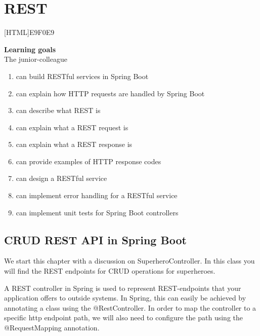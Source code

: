 \chapter{REST}

[HTML]{E9F0E9}{\parbox{\textwidth}{%
\noindent \textbf{Learning goals}\\
The junior-colleague
\begin{enumerate}[nolistsep]
\item can build RESTful services in Spring Boot
\item can explain how HTTP requests are handled by Spring Boot
\item can describe what REST is
\item can explain what a REST request is
\item can explain what a REST response is
\item can provide examples of HTTP response codes
\item can design a RESTful service \cite{codecademy-rest}
\item can implement error handling for a RESTful service
\item can implement unit tests for Spring Boot controllers
\end{enumerate}}}

\section{CRUD REST API in Spring Boot}

We start this chapter with a discussion on SuperheroController.
In this class you will find the REST endpoints for CRUD operations for superheroes.

A REST controller in Spring is used to represent REST-endpoints that your application offers to outside systems.
In Spring, this can easily be achieved by annotating a class using the @RestController.
In order to map the controller to a specific http endpoint path, we will also need to configure the path using the @RequestMapping annotation.

